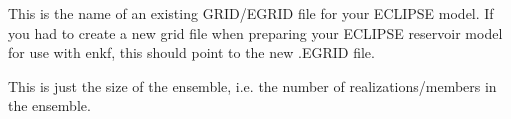 \documentclass[letterpaper,10pt,english]{sphinxmanual}
\begin{document}
\label{\detokenize{keywords/index:grid}}
\begin{sphinxShadowBox}

This is the name of an existing GRID/EGRID file for your ECLIPSE model. If you
had to create a new grid file when preparing your ECLIPSE reservoir model for
use with enkf, this should point to the new .EGRID file.


%
\begin{sphinxVerbatim}[commandchars=\\\{\}]
      
 
\end{sphinxVerbatim}
\end{sphinxShadowBox}
\label{\detokenize{keywords/index:num-realizations}}
\begin{sphinxShadowBox}

This is just the size of the ensemble, i.e. the number of realizations/members
in the ensemble.


%
\begin{sphinxVerbatim}[commandchars=\\\{\}]
   
 
\end{sphinxVerbatim}
\end{sphinxShadowBox}
\label{\detokenize{keywords/index:schedule-file}}
\end{document}
